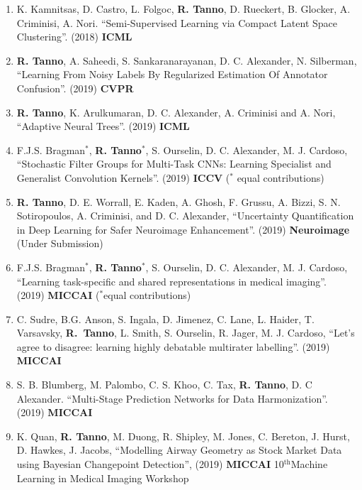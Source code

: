 \begin{enumerate}
	\item K. Kamnitsas, D. Castro, L. Folgoc, \textbf{R. Tanno}, D. Rueckert, B. Glocker, A. Criminisi, A. Nori. ``Semi-Supervised Learning via Compact Latent Space Clustering''. (2018) \textbf{ICML}
	
	\item \textbf{R. Tanno}, A. Saheedi, S. Sankaranarayanan, D. C. Alexander, N. Silberman, ``Learning From Noisy Labels By Regularized Estimation Of Annotator Confusion''.  (2019) \textbf{CVPR}
	\item \textbf{R. Tanno}, K. Arulkumaran, D. C. Alexander, A. Criminisi and A. Nori,  “Adaptive Neural Trees”.  (2019) \textbf{ICML }
	\item F.J.S. Bragman$^*$, \textbf{R. Tanno}$^*$, S. Ourselin, D. C. Alexander, M. J. Cardoso, ``Stochastic Filter Groups for Multi-Task CNNs: Learning Specialist and Generalist Convolution Kernels''.  (2019) \textbf{ICCV} ($^*$ equal contributions)
	
	\item \textbf{R. Tanno}, D. E. Worrall, E. Kaden, A. Ghosh, F. Grussu, A. Bizzi, S. N. Sotiropoulos, A. Criminisi, and D. C. Alexander, ``Uncertainty Quantification in Deep Learning for Safer Neuroimage Enhancement''. (2019) \textbf{Neuroimage} (Under Submission)
	
	\item F.J.S. Bragman$^*$, \textbf{R. Tanno}$^*$, S. Ourselin, D. C. Alexander, M. J. Cardoso, ``Learning task-specific and shared representations in medical imaging''.  (2019) \textbf{MICCAI} ($^*$equal contributions)
	
	\item C. Sudre, B.G. Anson, S. Ingala, D. Jimenez, C. Lane, L. Haider, T. Varsavsky,  \textbf{R.~Tanno}, L. Smith, S. Ourselin, R. Jager, M. J. Cardoso, ``Let's agree to disagree: learning highly debatable multirater labelling''.  (2019) \textbf{MICCAI} 
	
	\item S. B. Blumberg, M. Palombo, C. S. Khoo, C. Tax, \textbf{R. Tanno}, D. C Alexander. “Multi-Stage Prediction Networks for Data Harmonization”. (2019) \textbf{MICCAI }
	
	\item K. Quan, \textbf{R. Tanno}, M. Duong, R. Shipley, M. Jones, C. Bereton, J. Hurst, D. Hawkes, J. Jacobs, 	``Modelling Airway Geometry as Stock Market Data using Bayesian Changepoint Detection'', (2019) \textbf{MICCAI} 10$^{\text{th}}$Machine Learning in Medical Imaging Workshop
	
\end{enumerate}

